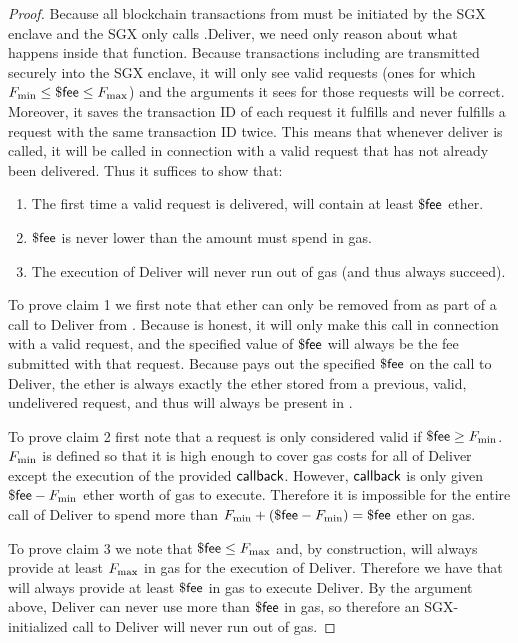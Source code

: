 \begin{proof}

Because all blockchain transactions from \sgxadd must be initiated by the SGX enclave and the SGX only calls \tcont.Deliver,
we need only reason about what happens inside that function.
Because transactions including \tcont are transmitted securely into the SGX enclave, it will only see valid requests (ones for which $F_{\rm min} \leq \${\sf fee} \leq F_{\rm max}$) and the arguments it sees for those requests will be correct.
Moreover, it saves the transaction ID of each request it fulfills and never fulfills a request with the same transaction ID twice.
This means that whenever deliver is called, it will be called in connection with a valid request that has not already been delivered.
Thus it suffices to show that:
\begin{enumerate}
  \item The first time a valid request is delivered, \tcont will contain at least $\${\sf fee}$ ether.
  \item $\${\sf fee}$ is never lower than the amount \sgxadd must spend in gas.
  \item The execution of Deliver will never run out of gas (and thus always succeed).
\end{enumerate}

To prove claim 1 we first note that ether can only be removed from \tcont as part of a call to Deliver from \sgxadd.
Because \sgxadd is honest, it will only make this call in connection with a valid request, and the specified value of $\${\sf fee}$ will always be the fee submitted with that request.
Because \tcont pays out the specified $\${\sf fee}$ on the call to Deliver, the ether is always exactly the ether stored from a previous, valid, undelivered request, and thus will always be present in \tcont.

To prove claim 2 first note that a request is only considered valid if $\${\sf fee} \geq F_{\rm min}$.
$F_{\rm min}$ is defined so that it is high enough to cover gas costs for all of Deliver except the execution of the provided ${\sf callback}$.
However, ${\sf callback}$ is only given $\${\sf fee} - F_{\rm min}$ ether worth of gas to execute.
Therefore it is impossible for the entire call of Deliver to spend more than $F_{\rm min} + (\${\sf fee} - F_{\rm min}) = \${\sf fee}$ ether on gas.

To prove claim 3 we note that $\${\sf fee} \leq F_{\rm max}$ and, by construction, \sgxadd will always provide at least $F_{\rm max}$ in gas for the execution of Deliver.
Therefore we have that \sgxadd will always provide at least $\${\sf fee}$ in gas to execute Deliver.
By the argument above, Deliver can never use more than $\${\sf fee}$ in gas, so therefore an SGX-initialized call to Deliver will never run out of gas.
\end{proof}



